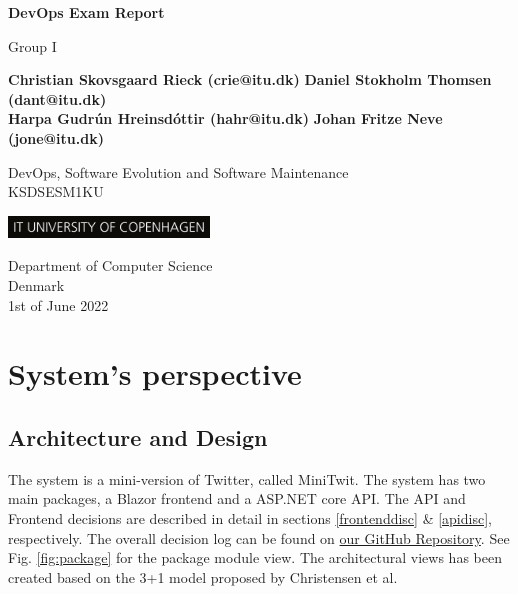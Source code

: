 \documentclass[10pt]{article}
\newcommand{\frontmatter}{\clearpage \cfoot{\thepage\ }
\fancyhead{}
\renewcommand{\headrulewidth}{0pt}
\setcounter{page}{1}
\pagenumbering{Roman}}
\newcommand{\mainmatter}{\clearpage \cfoot{\thepage\ of \pageref{LastPage}}
\fancyhead[LE,RO]{Group I}\fancyhead[RE,LO]{\leftmark}
\renewcommand{\headrulewidth}{0.4pt}
\setcounter{page}{1}
\pagenumbering{arabic}}
\begin{document}
\begin{titlepage}
    \begin{center}
        \vspace*{1cm}

        \Huge
        \textbf{DevOps Exam Report}
        
        \vspace{0.5cm}
        
        \Large
        Group I
            
        \vspace{1.5cm}
         
        \textbf{Christian Skovsgaard Rieck (crie@itu.dk)}
        \textbf{Daniel Stokholm Thomsen (dant@itu.dk)}\\
        \textbf{Harpa Gudrún Hreinsdóttir (hahr@itu.dk)}
        \textbf{Johan Fritze Neve (jone@itu.dk)}
            
        \vspace{1.5cm}
        
       
            
        \vfill
            
        DevOps, Software Evolution and Software Maintenance\\
         KSDSESM1KU
            
        \vspace{0.8cm}
            
        \includegraphics[width=0.4\textwidth]{images/ITU_logo_UK.jpg}
            
        \Large
        Department of Computer Science\\
        Denmark\\
        1st of June 2022
            
    \end{center}
\end{titlepage}

\frontmatter
\tableofcontents

\mainmatter

\section{System's perspective}
\subsection{Architecture and Design}
The system is a mini-version of Twitter, called MiniTwit.
The system has two main packages, a Blazor frontend and a ASP.NET core API. The API and Frontend decisions are described in detail in sections \ref{frontenddisc} \& \ref{apidisc}, respectively. The overall decision log can be found on \href{https://github.com/Arklaide/devopsITUproject/blob/main/report/sub-reports/decision_log.md}{our GitHub Repository}. See Fig. \ref{fig:package} for the package module view. The architectural views has been created based on the 3+1 model proposed by Christensen et al\cite{christensen20163+}.
\end{document}
